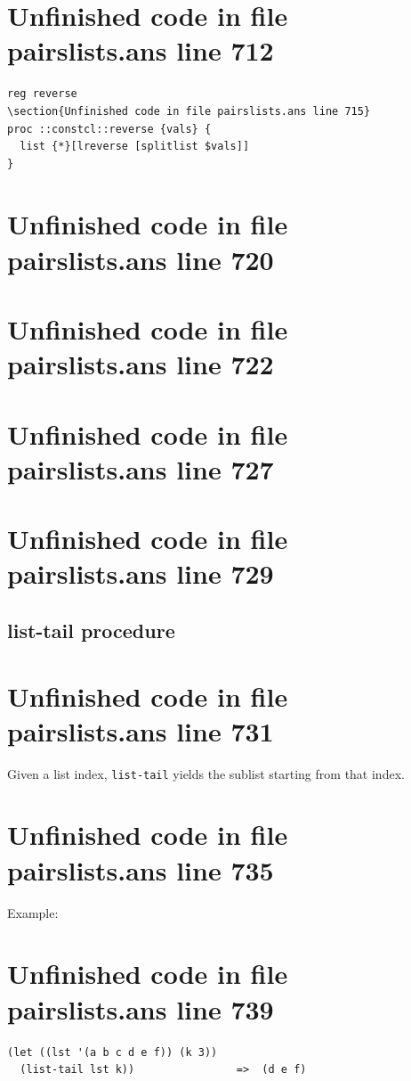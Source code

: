 \documentclass[twoside,9pt]{report}
\begin{document}
\section{Unfinished code in file pairslists.ans line 712}
\begin{lstlisting}
reg reverse
\section{Unfinished code in file pairslists.ans line 715}
proc ::constcl::reverse {vals} {
  list {*}[lreverse [splitlist $vals]]
}
\end{lstlisting}
\section{Unfinished code in file pairslists.ans line 720}
\section{Unfinished code in file pairslists.ans line 722}
\section{Unfinished code in file pairslists.ans line 727}
\section{Unfinished code in file pairslists.ans line 729}
\subsection{list-tail procedure}
\label{list-tail-procedure}
\section{Unfinished code in file pairslists.ans line 731}


Given a list index, \texttt{list-tail} yields the sublist starting from that index.

\section{Unfinished code in file pairslists.ans line 735}


Example:

\section{Unfinished code in file pairslists.ans line 739}
\begin{verbatim}
(let ((lst '(a b c d e f)) (k 3))
  (list-tail lst k))                =>  (d e f)
\end{verbatim}
\end{document}
